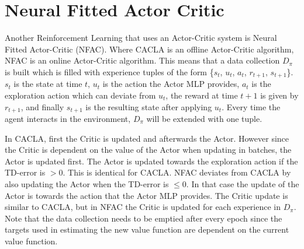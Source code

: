 
\section{Neural Fitted Actor Critic}
Another Reinforcement Learning that uses an Actor-Critic system is Neural Fitted Actor-Critic (NFAC). Where CACLA is an offline Actor-Critic algorithm, NFAC is an online Actor-Critic algorithm. This means that a data collection $D_{\pi}$ is built which is filled with experience tuples of the form \{$s_{t}$, $u_{t}$, $a_{t}$, $r_{t+1}$, $s_{t+1}$\}. $s_{t}$ is the state at time $t$, $u_{t}$ is the action the Actor MLP provides, $a_{t}$ is the exploration action which can deviate from $u_{t}$, the reward at time $t+1$ is given by $r_{t+1}$, and finally $s_{t+1}$ is the resulting state after applying $u_{t}$. Every time the agent interacts in the environment, $D_{\pi}$ will be extended with one tuple.

In CACLA, first the Critic is updated and afterwards the Actor. However since the Critic is dependent on the value of the Actor when updating in batches, the Actor is updated first. The Actor is updated towards the exploration action if the TD-error is $> 0$. This is identical for CACLA. NFAC deviates from CACLA by also updating the Actor when the TD-error is $\leq 0$. In that case the update of the Actor is towards the action that the Actor MLP provides. The Critic update is similar to CACLA, but in NFAC the Critic is updated for each experience in $D_{\pi}$. Note that the data collection needs to be emptied after every epoch since the targets used in estimating the new value function are dependent on the current value function. 

